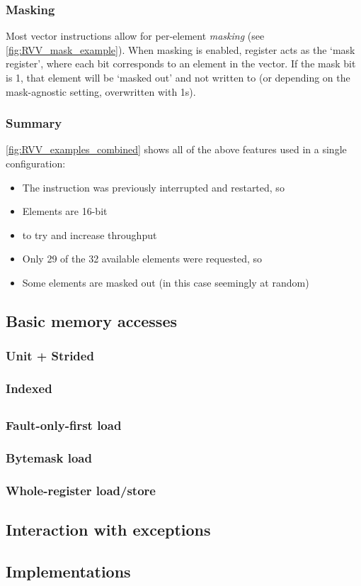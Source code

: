 \subsubsection{Masking}
Most vector instructions allow for per-element \emph{masking} (see \cref{fig:RVV_mask_example}).
When masking is enabled, register  acts as the `mask register', where each bit corresponds to an element in the vector.
If the mask bit is 1, that element will be `masked out' and not written to (or depending on the mask-agnostic setting, overwritten with 1s).


\subsubsection{Summary}
\cref{fig:RVV_examples_combined} shows all of the above features used in a single configuration:
\begin{itemize}
    \item The instruction was previously interrupted and restarted, so 
    \item Elements are 16-bit
    \item {} to try and increase throughput
    \item Only 29 of the 32 available elements were requested, so 
    \item Some elements are masked out (in this case seemingly at random)
\end{itemize}

\subsection{Basic memory accesses}

\subsubsection{Unit + Strided}

\subsubsection{Indexed}

\subsection{}
\subsubsection{Fault-only-first load}
\subsubsection{Bytemask load}
\subsubsection{Whole-register load/store}

\subsection{Interaction with exceptions}

\subsection{Implementations}